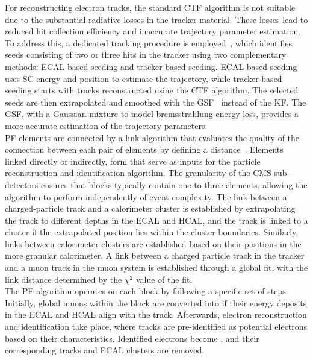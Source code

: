 For reconstructing electron tracks, the standard \ac{CTF} algorithm is not suitable due to the substantial radiative losses in the tracker material. 
These losses lead to reduced hit collection efficiency and inaccurate trajectory parameter estimation. 
To address this, a dedicated tracking procedure is employed~\cite{CMS:2015xaf}, which identifies seeds consisting of two or three hits in the tracker using two complementary methods: \ac{ECAL}-based seeding and tracker-based seeding. 
\ac{ECAL}-based seeding uses \ac{SC} energy and position to estimate the trajectory, while tracker-based seeding starts with tracks reconstructed using the \ac{CTF} algorithm.
The selected seeds are then extrapolated and smoothed with the \ac{GSF}~\cite{Adam:2003kg} instead of the \ac{KF}. 
The \ac{GSF}, with a Gaussian mixture to model bremsstrahlung energy loss, provides a more accurate estimation of the trajectory parameters. \\

\ac{PF} elements are connected by a link algorithm that evaluates the quality of the connection between each pair of elements by defining a distance~\cite{PF_CMS}.
Elements linked directly or indirectly, form  that serve as inputs for the particle reconstruction and identification algorithm. 
The granularity of the \ac{CMS} sub-detectors ensures that blocks typically contain one to three elements, allowing the algorithm to perform independently of event complexity. 
The link between a charged-particle track and a calorimeter cluster is established by extrapolating the track to different depths in the \ac{ECAL} and \ac{HCAL}, and the track is linked to a cluster if the extrapolated position lies within the cluster boundaries. 
Similarly, links between calorimeter clusters are established based on their positions in the more granular calorimeter. 
A link between a charged particle track in the tracker and a muon track in the muon system is established through a global fit, with the link distance determined by the $\chi^2$ value of the fit. \\

The \ac{PF} algorithm operates on each block by following a specific set of steps. 
Initially, global muons within the block are converted into  if their energy deposits in the \ac{ECAL} and \ac{HCAL} align with the track. 
Afterwards, electron reconstruction and identification take place, where tracks are pre-identified as potential electrons based on their characteristics. 
Identified electrons become , and their corresponding tracks and \ac{ECAL} clusters are removed. \\

